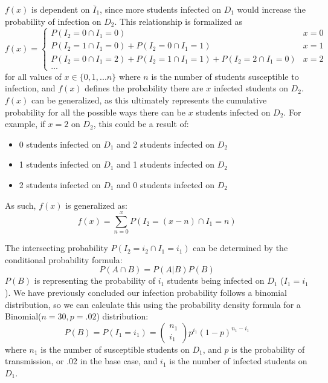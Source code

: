 \documentclass[
	letterpaper, %
]{jdf}
\begin{document}
\(f(x)\) is dependent on \(\overline{I}_1\), since more students infected on \(D_1\) would increase the probability of infection on \(D_2\). This relationship is formalized as
\[f(x) = \left\{\begin{matrix}
P(I_2 = 0\cap I_1=0) & x=0\\ 
P(I_2 = 1\cap I_1=0)+P(I_2 = 0\cap I_1=1) & x=1\\ 
P(I_2 = 0\cap I_1=2)+P(I_2 = 1\cap I_1=1)+P(I_2 = 2\cap I_1=0) & x=2\\ 
...

\end{matrix}\right.\]
for all values of \(x \in \{0,1,... n\}\) where \(n\) is the number of  students susceptible to infection, and \(f(x)\) defines the probability there are \(x\) infected students on \(D_2\). \(f(x)\) can be generalized, as this ultimately represents the cumulative probability for all the possible ways there can be \(x\) students infected on \(D_2\). For example, if \(x=2\) on \(D_2\), this could be a result of:
\begin{itemize}[noitemsep]
    \item 0 students infected on \(D_1\) and 2 students infected on \(D_2\)
    \item   1 students infected on \(D_1\) and 1 students infected on \(D_2\)
    \item 2 students infected on \(D_1\) and 0 students infected on \(D_2\)
\end{itemize}


As such, \(f(x)\) is generalized as:
\[f(x) = \sum_{n=0}^{x}P\left (I_2 = (x-n)\cap I_1=n  \right )\]

The intersecting probability \(P(I_2 = i_2\cap I_1=i_1)\) can be determined by the conditional probability formula: \[P(A\cap B) = P(A|B)P(B)\]
\(P(B)\) is representing the probability of \(i_1\) students being infected on \(D_1\) (\(I_1 = i_1\)). We have previously concluded our infection probability follows a binomial distribution, so we can calculate this using the probability density formula for a Binomial(\(n = 30, p = .02\)) distribution:
\[P(B) = P(I_1 = i_1) = \left(\begin{array}{l}
n_1 \\
i_1
\end{array}\right) p^{i_1}(1-p)^{n_1-i_1}\]
where \(n_1\) is the number of susceptible students on \(D_1\), and \(p\) is the probability of transmission, or .02 in the base case, and \(i_1\) is the number of infected students on \(D_1\).
\end{document}
